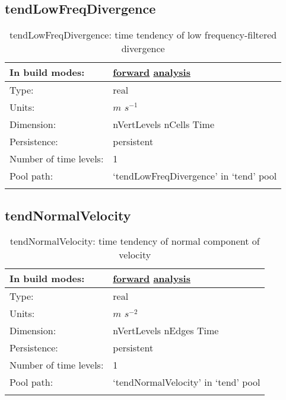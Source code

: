\subsection[tendLowFreqDivergence]{tendLowFreqDivergence}
\label{subsec:var_sec_tend_tendLowFreqDivergence}
\begin{center}
\begin{longtable}{| p{2.0in} | p{4.0in} |}
        \hline 
        In build modes: & \hyperref[subsec:forward_var_tab_tend]{forward} \hyperref[subsec:analysis_var_tab_tend]{analysis} \\
        \hline 
        Type: & real \\
        \hline 
        Units: & $m$ $s^{-1}$ \\
        \hline 
        Dimension: & nVertLevels nCells Time \\
        \hline 
        Persistence: & persistent \\
        \hline 
        Number of time levels: & 1 \\
        \hline 
            Pool path: & `tendLowFreqDivergence' in `tend' pool \\
		 \hline 
    \caption{tendLowFreqDivergence: time tendency of low frequency-filtered divergence}
\end{longtable}
\end{center}
\subsection[tendNormalVelocity]{tendNormalVelocity}
\label{subsec:var_sec_tend_tendNormalVelocity}
\begin{center}
\begin{longtable}{| p{2.0in} | p{4.0in} |}
        \hline 
        In build modes: & \hyperref[subsec:forward_var_tab_tend]{forward} \hyperref[subsec:analysis_var_tab_tend]{analysis} \\
        \hline 
        Type: & real \\
        \hline 
        Units: & $m$ $s^{-2}$ \\
        \hline 
        Dimension: & nVertLevels nEdges Time \\
        \hline 
        Persistence: & persistent \\
        \hline 
        Number of time levels: & 1 \\
        \hline 
            Pool path: & `tendNormalVelocity' in `tend' pool \\
		 \hline 
    \caption{tendNormalVelocity: time tendency of normal component of velocity}
\end{longtable}
\end{center}
